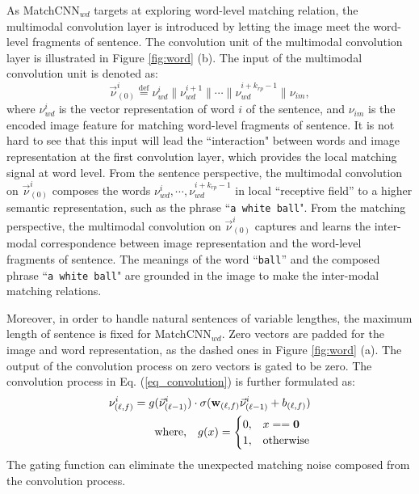 \documentclass[10pt,twocolumn,letterpaper]{article}
\begin{document}
As MatchCNN$_{wd}$ targets at exploring word-level matching relation, the multimodal convolution layer is introduced by letting the image meet the word-level fragments of sentence. The convolution unit of the multimodal convolution layer is illustrated in Figure \ref{fig:word} (b). The input of the multimodal convolution unit is denoted as:
\begin{equation}
\label{eq_multimodal_word}
\vec{\nu}_{(0)}^{i}  \overset{\text{def}}{=}  \nu_{wd}^{i} \parallel \nu_{wd}^{i+1} \parallel \cdots \parallel\nu_{wd}^{i+k_{rp}-1}\parallel\nu_{im},
\end{equation}
where $\nu_{wd}^{i}$ is the vector representation of word $i$ of the sentence, and $\nu_{im}$ is the encoded image feature for matching word-level fragments of sentence.  It is not hard to see that this input will lead the ``interaction" between words and image representation at the first convolution layer, which provides the local matching signal at word level. From the sentence perspective, the multimodal convolution on $\vec{\nu}_{(0)}^{i}$ composes the words $\nu_{wd}^{i},\cdots, \nu_{wd}^{i+k_{rp}-1}$ in local ``receptive field'' to a higher semantic representation, such as the phrase ``\texttt{\small a white ball}". From the matching perspective, the multimodal convolution on $\vec{\nu}_{(0)}^{i}$ captures and learns the inter-modal correspondence between image representation and the word-level fragments of sentence. The meanings of the word ``\texttt{\small ball}'' and the composed phrase ``\texttt{\small a white ball}" are grounded in the image to make the inter-modal matching relations.

Moreover, in order to handle natural sentences of variable lengthes, the maximum length of sentence is fixed for MatchCNN$_{wd}$. Zero vectors are padded for the image and word representation, as the dashed ones in Figure \ref{fig:word} (a). The output of the convolution process on zero vectors is gated to be zero. The convolution process in Eq. (\ref{eq_convolution}) is further formulated as:
 \begin{equation}
\label{eq_gate}
\begin{split}
\nu_{(\ell, f)}^{i}=g(\vec{\nu}_{(\ell-1)}^{i})\cdot \sigma(\mathbf{w}_{(\ell,f)} \vec{\nu}_{(\ell-1)}^{i} + b_{(\ell,f)})\\
\hbox{where,}  \quad g(x)=
\begin{cases}
0, & x==\textbf{0}\cr
1,& \hbox{otherwise}
\end{cases}
\end{split}
\end{equation}
The gating function can eliminate the unexpected matching noise composed from the convolution process.
\end{document}
